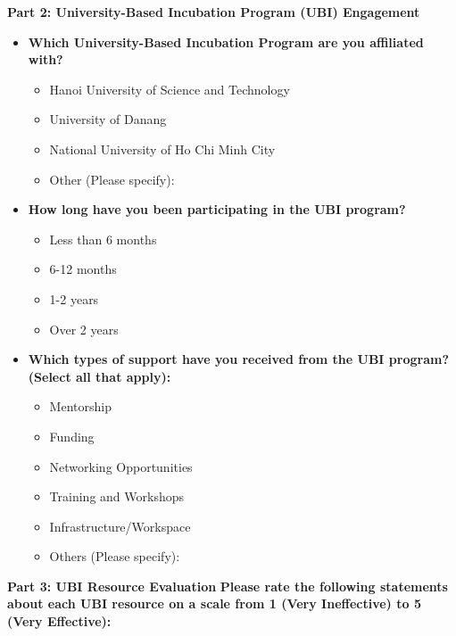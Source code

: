 \documentclass[../Main.tex]{subfiles}%
\begin{document}
	\textbf{Part 2: University-Based Incubation Program (UBI) Engagement}
	\begin{itemize}
		\item \textbf{Which University-Based Incubation Program are you affiliated with?}
		\begin{itemize}
			\item Hanoi University of Science and Technology
			\item University of Danang
			\item National University of Ho Chi Minh City
			\item Other (Please specify): \underline{\hspace{4cm}}
		\end{itemize}
		\item \textbf{How long have you been participating in the UBI program?}
		\begin{itemize}
			\item Less than 6 months
			\item 6-12 months
			\item 1-2 years
			\item Over 2 years
		\end{itemize}
		\item \textbf{Which types of support have you received from the UBI program? (Select all that apply):}
		\begin{itemize}
			\item Mentorship
			\item Funding
			\item Networking Opportunities
			\item Training and Workshops
			\item Infrastructure/Workspace
			\item Others (Please specify): \underline{\hspace{4cm}}
		\end{itemize}
	\end{itemize}
	
	\textbf{Part 3: UBI Resource Evaluation}
	\textbf{Please rate the following statements about each UBI resource on a scale from 1 (Very Ineffective) to 5 (Very Effective):}
	
\end{document}
